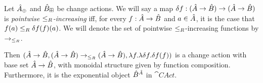 \iffalse
\begin{prop}[name=Exponentials, restate=exponentials]
\label{prop:exponentials}
  Let $\hat{A}_\oplus$ and $\hat{B}_\boxplus$ be change actions. We will say a map 
  $\delta f : (\hat{A} \rightarrow \hat{B}) \rightarrow (\hat{A} \rightarrow \hat{B})$ 
  is \emph{pointwise $\leq_R$-increasing} iff, for every $f : \hat{A} \rightarrow \hat{B}$
  and $a \in \hat{A}$, it is the case that $f(a) \leq_R \delta f(f)(a)$.
  We will denote the set of pointwise $\leq_R$-increasing functions by $\rightarrow_{\leq_R}$.

  Then $(\hat{A} \rightarrow \hat{B},(\hat{A} \rightarrow \hat{B}) \rightarrow_{\leq_R} (\hat{A} \rightarrow \hat{B}),\lambda f . \lambda \delta f . \delta f(f))$
  is a change action with base
  set $\hat{A} \rightarrow \hat{B}$, with monoidal structure given by function composition.
  Furthermore, it is the exponential object $\hat{B}^{\hat{A}}$ in $\cat{CAct}$.
\end{prop}
\ifproofs
